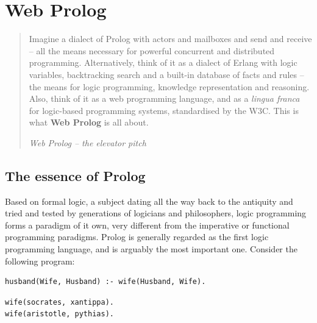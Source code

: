 \chapter{Web Prolog}\label{sec:web-prolog}

\begin{quotation}
\noindent Imagine a dialect of Prolog with actors and mailboxes and send and receive -- all the means necessary for powerful concurrent and distributed programming. Alternatively, think of it as a dialect of Erlang with logic variables, backtracking search and a built-in database of facts and rules -- the means for logic programming, knowledge representation and reasoning. Also, think of it as a web programming language, and as a \textit{lingua franca} for logic-based programming systems, standardised by the W3C. This is what \textbf{Web Prolog} is all about.

\flushright\textit{Web Prolog -- the elevator pitch}
\end{quotation}
\vspace{1.0cm}

\noindent %

\section{The essence of Prolog}

\noindent Based on formal logic, a subject dating all the way back to the antiquity and tried and tested by generations of logicians and philosophers, logic programming forms a paradigm of it own, very different from the imperative or functional programming paradigms. Prolog is generally regarded as the first logic programming language, and is arguably the most important one. Consider the following program:

\begin{verbatim}
husband(Wife, Husband) :- wife(Husband, Wife).
\end{verbatim}
\vspace{-3mm}
\begin{verbatim}
wife(socrates, xantippa).
wife(aristotle, pythias).
\end{verbatim}

